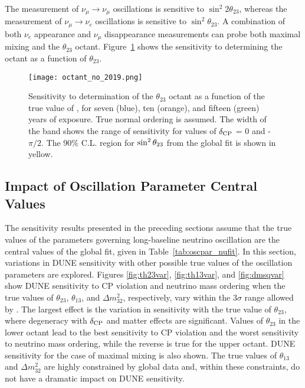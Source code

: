 The measurement of $\nu_\mu \rightarrow \nu_\mu$ oscillations is sensitive to $\sin ^2 2 \theta_{23}$, whereas the measurement of $\nu_\mu \rightarrow \nu_e$ oscillations is sensitive to $\sin^2 \theta_{23}$.  A combination of both $\nu_e$ appearance and $\nu_\mu$ disappearance measurements can probe both maximal mixing and
the $\theta_{23}$ octant.  
Figure~\ref{fig:octant} shows the sensitivity to determining the octant as a function of $\theta_{23}$.

\begin{figure}[h!]
    \centering
		\texttt{[image: octant\_no\_2019.png]}
	\caption[Sensitivity of determination of the $\theta_{23}$ octant as a function of ]{Sensitivity to determination of the $\theta_{23}$ octant as a function of the true value of , for seven (blue), ten (orange), and fifteen (green) years of exposure. True normal ordering is assumed. The width of the band shows the range of sensitivity for values of $\delta_{\rm CP}$ = 0 and -$\pi/2$. The 90\% C.L. region for $\sin^2\theta_{23}$ from the  global fit is shown in yellow.}
    \label{fig:octant}
\end{figure}

\subsection{Impact of Oscillation Parameter Central Values}
\label{sec:physics-lbnosc-oscvar}
The sensitivity results presented in the preceding sections assume that the true values of the parameters governing long-baseline neutrino oscillation are the central values of the  global fit, given in Table~\ref{tab:oscpar_nufit}. In this section, variations in DUNE sensitivity with other possible true values of the oscillation parameters are explored.
Figures \ref{fig:th23var}, \ref{fig:th13var}, and \ref{fig:dmsqvar} show DUNE sensitivity to CP violation and neutrino mass ordering when the true values of $\theta_{23}$, $\theta_{13}$, and $\Delta m^{2}_{32}$, respectively, vary within the 3$\sigma$ range allowed by . The largest effect is the variation in sensitivity with the true value of $\theta_{23}$, where degeneracy with $\delta_{\rm CP}$ and matter effects are significant. Values of $\theta_{23}$ in the lower octant lead to the best sensitivity to CP violation and the worst sensitivity to neutrino mass ordering, while the reverse is true for the upper octant. DUNE sensitivity for the case of maximal mixing is also shown. The true values of $\theta_{13}$ and $\Delta m^2_{32}$ are highly constrained by global data and, within these constraints, do not have a dramatic impact on DUNE sensitivity.  

